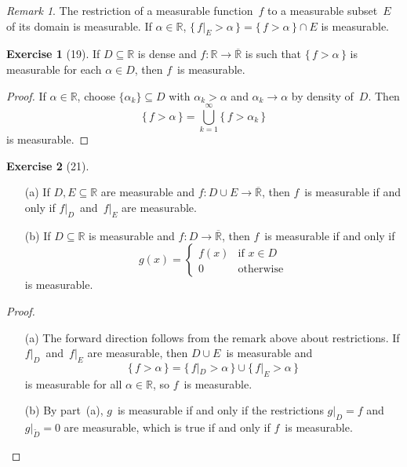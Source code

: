 \documentclass[letterpaper,12pt]{article}
\newcommand{\R}{\mathbb{R}}
\newcommand{\Rex}{\overline{\R}}
\newcommand{\union}{\cup}
\newcommand{\sect}{\cap}
\newcommand{\bigunion}{\bigcup}
\newcommand{\comp}[1]{\widetilde{#1}}
\newcommand{\res}[2]{{#1}|_{#2}}
\theoremstyle{plain}
\theoremstyle{definition}
\newtheorem*{exer}{Exercise}
\theoremstyle{remark}
\newtheorem*{rmk}{Remark}
\begin{document}
\begin{rmk}
The restriction of a measurable function~\(f\) to a measurable subset~\(E\) of its domain is measurable. If \(\alpha\in\R\), \(\{\,\res{f}{E}>\alpha\,\}=\{\,f>\alpha\,\}\sect E\) is measurable.
\end{rmk}

\begin{exer}[19]
If \(D\subseteq\R\) is dense and \(f:\R\to\Rex\) is such that \(\{\,f>\alpha\,\}\) is measurable for each \(\alpha\in D\), then \(f\)~is measurable.
\end{exer}
\begin{proof}
If \(\alpha\in\R\), choose \(\{\alpha_k\}\subseteq D\) with \(\alpha_k>\alpha\) and \(\alpha_k\to\alpha\) by density of~\(D\). Then
\[\{\,f>\alpha\,\}=\bigunion_{k=1}^{\infty}\{\,f>\alpha_k\,\}\]
is measurable.
\end{proof}

\begin{exer}[21]\ 
\begin{enumerate}
\item[(a)] If \(D,E\subseteq\R\) are measurable and \(f:D\union E\to\Rex\), then \(f\)~is measurable if and only if \(\res{f}{D}\)~and~\(\res{f}{E}\) are measurable.
\item[(b)] If \(D\subseteq\R\) is measurable and \(f:D\to\Rex\), then \(f\)~is measurable if and only if
\[g(x)=\begin{cases}
f(x)&\text{if }x\in D\\
0&\text{otherwise}
\end{cases}\]
is measurable.
\end{enumerate}
\end{exer}
\begin{proof}\ 
\begin{enumerate}
\item[(a)] The forward direction follows from the remark above about restrictions. If \(\res{f}{D}\)~and~\(\res{f}{E}\) are measurable, then \(D\union E\)~is measurable and
\[\{\,f>\alpha\,\}=\{\,\res{f}{D}>\alpha\,\}\union\{\,\res{f}{E}>\alpha\,\}\]
is measurable for all \(\alpha\in\R\), so \(f\)~is measurable.
\item[(b)] By part~(a), \(g\)~is measurable if and only if the restrictions \(\res{g}{D}=f\) and \(\res{g}{\comp{D}}=0\) are measurable, which is true if and only if \(f\)~is measurable.\qedhere
\end{enumerate}
\end{proof}
\end{document}
